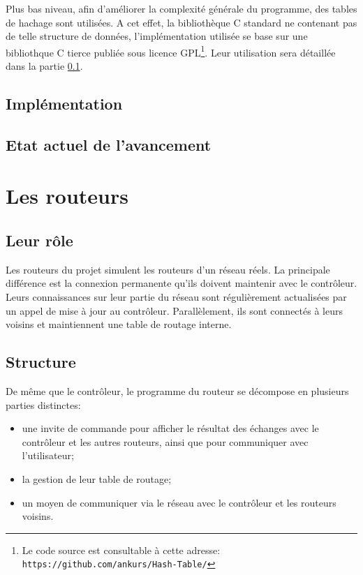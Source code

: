 \documentclass[a4paper,11pt]{article}
\begin{document}
Plus bas niveau, afin d'améliorer la complexité générale du programme, des tables de hachage sont utilisées. A cet effet, la bibliothèque C standard ne contenant pas de telle structure de données, l'implémentation utilisée se base sur une bibliothque C tierce publiée sous licence GPL\footnote{Le code source est consultable à cette adresse: \texttt{https://github.com/ankurs/Hash-Table/}}. Leur utilisation sera détaillée dans la partie \ref{implementation_controleur}.

\subsection{Implémentation}
\label{implementation_controleur}

\subsection{Etat actuel de l'avancement}

\section{Les routeurs}

\subsection{Leur rôle}

Les routeurs du projet simulent les routeurs d'un réseau réels. La principale différence est la connexion permanente qu'ils doivent maintenir avec le contrôleur. Leurs connaissances sur leur partie du réseau sont régulièrement actualisées par un appel de mise à jour au contrôleur. Parallèlement, ils sont connectés à leurs voisins et maintiennent une table de routage interne.

\subsection{Structure}

De même que le contrôleur, le programme du routeur se décompose en plusieurs parties distinctes:
\begin{itemize}
  \item une invite de commande pour afficher le résultat des échanges avec le contrôleur et les autres routeurs, ainsi que pour communiquer avec l'utilisateur;
  \item la gestion de leur table de routage;
  \item un moyen de communiquer via le réseau avec le contrôleur et les routeurs voisins.
\end{itemize}
\end{document}
